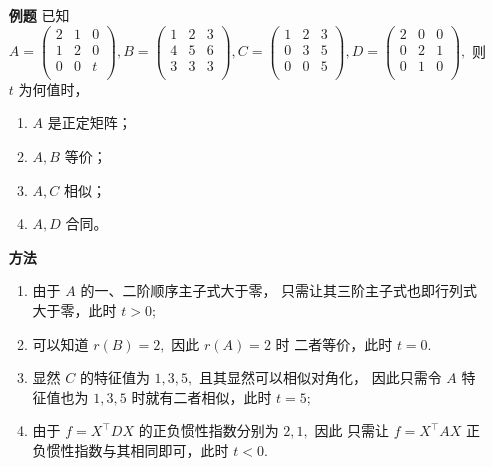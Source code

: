 \begin{itemize}
    \item[\textbf{例题}] 已知 $ A = \begin{pmatrix}
        2&1&0\\1&2&0\\0&0&t\\
    \end{pmatrix},
    B = \begin{pmatrix}
        1&2&3\\4&5&6\\3&3&3\\
    \end{pmatrix},
    C = \begin{pmatrix}
        1&2&3\\0&3&5\\0&0&5\\
    \end{pmatrix},
    D = \begin{pmatrix}
        2&0&0\\0&2&1\\0&1&0\\
    \end{pmatrix}, $ 则 $ t $ 为何值时，
    \begin{enumerate}[label = \Roman*.]
        \item $ A $ 是正定矩阵；
        \item $ A,B $ 等价；
        \item $ A,C $ 相似；
        \item $ A,D $ 合同。
    \end{enumerate}
    \item[\textbf{方法}] 
    \begin{enumerate}[label = \Roman*.]
        \item 由于 $ A $ 的一、二阶顺序主子式大于零，
        只需让其三阶主子式也即行列式大于零，此时 $ t > 0; $ 
        \item 可以知道 $ r(B) = 2, $ 因此 $ r(A) = 2 $ 时
        二者等价，此时 $ t = 0. $ 
        \item 显然 $ C $ 的特征值为 $ 1,3,5, $ 且其显然可以相似对角化，
        因此只需令 $ A $ 特征值也为 $ 1,3,5 $ 时就有二者相似，此时 $ t = 5; $ 
        \item 由于 $ f = X^\top DX $ 的正负惯性指数分别为 $ 2,1, $ 因此
        只需让 $ f = X^\top AX $ 正负惯性指数与其相同即可，此时 $ t<0. $  
    \end{enumerate}
\end{itemize}